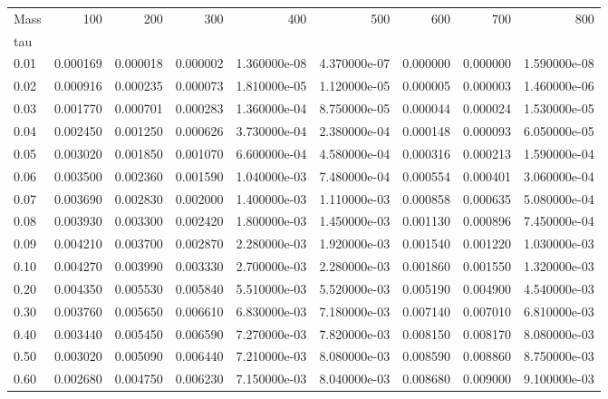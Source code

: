 \begin{tabular}{lrrrrrrrr}
\toprule
Mass &       100 &       200 &       300 &           400 &           500 &       600 &       700 &           800 \\
tau   &           &           &           &               &               &           &           &               \\
\midrule
0.01  &  0.000169 &  0.000018 &  0.000002 &  1.360000e-08 &  4.370000e-07 &  0.000000 &  0.000000 &  1.590000e-08 \\
0.02  &  0.000916 &  0.000235 &  0.000073 &  1.810000e-05 &  1.120000e-05 &  0.000005 &  0.000003 &  1.460000e-06 \\
0.03  &  0.001770 &  0.000701 &  0.000283 &  1.360000e-04 &  8.750000e-05 &  0.000044 &  0.000024 &  1.530000e-05 \\
0.04  &  0.002450 &  0.001250 &  0.000626 &  3.730000e-04 &  2.380000e-04 &  0.000148 &  0.000093 &  6.050000e-05 \\
0.05  &  0.003020 &  0.001850 &  0.001070 &  6.600000e-04 &  4.580000e-04 &  0.000316 &  0.000213 &  1.590000e-04 \\
0.06  &  0.003500 &  0.002360 &  0.001590 &  1.040000e-03 &  7.480000e-04 &  0.000554 &  0.000401 &  3.060000e-04 \\
0.07  &  0.003690 &  0.002830 &  0.002000 &  1.400000e-03 &  1.110000e-03 &  0.000858 &  0.000635 &  5.080000e-04 \\
0.08  &  0.003930 &  0.003300 &  0.002420 &  1.800000e-03 &  1.450000e-03 &  0.001130 &  0.000896 &  7.450000e-04 \\
0.09  &  0.004210 &  0.003700 &  0.002870 &  2.280000e-03 &  1.920000e-03 &  0.001540 &  0.001220 &  1.030000e-03 \\
0.10  &  0.004270 &  0.003990 &  0.003330 &  2.700000e-03 &  2.280000e-03 &  0.001860 &  0.001550 &  1.320000e-03 \\
0.20  &  0.004350 &  0.005530 &  0.005840 &  5.510000e-03 &  5.520000e-03 &  0.005190 &  0.004900 &  4.540000e-03 \\
0.30  &  0.003760 &  0.005650 &  0.006610 &  6.830000e-03 &  7.180000e-03 &  0.007140 &  0.007010 &  6.810000e-03 \\
0.40  &  0.003440 &  0.005450 &  0.006590 &  7.270000e-03 &  7.820000e-03 &  0.008150 &  0.008170 &  8.080000e-03 \\
0.50  &  0.003020 &  0.005090 &  0.006440 &  7.210000e-03 &  8.080000e-03 &  0.008590 &  0.008860 &  8.750000e-03 \\
0.60  &  0.002680 &  0.004750 &  0.006230 &  7.150000e-03 &  8.040000e-03 &  0.008680 &  0.009000 &  9.100000e-03 \\

\end{tabular}
